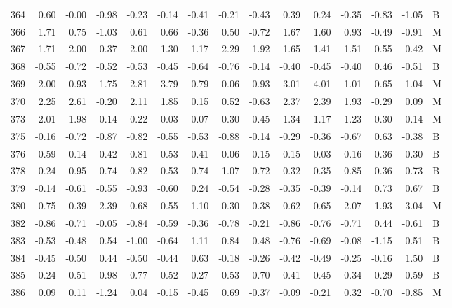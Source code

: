 \begin{table}[ht]
\begin{tabular}{rrrrrrrrrrrrrrl}
  364 & 0.60 & -0.00 & -0.98 & -0.23 & -0.14 & -0.41 & -0.21 & -0.43 & 0.39 & 0.24 & -0.35 & -0.83 & -1.05 & B \\ 
  366 & 1.71 & 0.75 & -1.03 & 0.61 & 0.66 & -0.36 & 0.50 & -0.72 & 1.67 & 1.60 & 0.93 & -0.49 & -0.91 & M \\ 
  367 & 1.71 & 2.00 & -0.37 & 2.00 & 1.30 & 1.17 & 2.29 & 1.92 & 1.65 & 1.41 & 1.51 & 0.55 & -0.42 & M \\ 
  368 & -0.55 & -0.72 & -0.52 & -0.53 & -0.45 & -0.64 & -0.76 & -0.14 & -0.40 & -0.45 & -0.40 & 0.46 & -0.51 & B \\ 
  369 & 2.00 & 0.93 & -1.75 & 2.81 & 3.79 & -0.79 & 0.06 & -0.93 & 3.01 & 4.01 & 1.01 & -0.65 & -1.04 & M \\ 
  370 & 2.25 & 2.61 & -0.20 & 2.11 & 1.85 & 0.15 & 0.52 & -0.63 & 2.37 & 2.39 & 1.93 & -0.29 & 0.09 & M \\ 
  373 & 2.01 & 1.98 & -0.14 & -0.22 & -0.03 & 0.07 & 0.30 & -0.45 & 1.34 & 1.17 & 1.23 & -0.30 & 0.14 & M \\ 
  375 & -0.16 & -0.72 & -0.87 & -0.82 & -0.55 & -0.53 & -0.88 & -0.14 & -0.29 & -0.36 & -0.67 & 0.63 & -0.38 & B \\ 
  376 & 0.59 & 0.14 & 0.42 & -0.81 & -0.53 & -0.41 & 0.06 & -0.15 & 0.15 & -0.03 & 0.16 & 0.36 & 0.30 & B \\ 
  378 & -0.24 & -0.95 & -0.74 & -0.82 & -0.53 & -0.74 & -1.07 & -0.72 & -0.32 & -0.35 & -0.85 & -0.36 & -0.73 & B \\ 
  379 & -0.14 & -0.61 & -0.55 & -0.93 & -0.60 & 0.24 & -0.54 & -0.28 & -0.35 & -0.39 & -0.14 & 0.73 & 0.67 & B \\ 
  380 & -0.75 & 0.39 & 2.39 & -0.68 & -0.55 & 1.10 & 0.30 & -0.38 & -0.62 & -0.65 & 2.07 & 1.93 & 3.04 & M \\ 
  382 & -0.86 & -0.71 & -0.05 & -0.84 & -0.59 & -0.36 & -0.78 & -0.21 & -0.86 & -0.76 & -0.71 & 0.44 & -0.61 & B \\ 
  383 & -0.53 & -0.48 & 0.54 & -1.00 & -0.64 & 1.11 & 0.84 & 0.48 & -0.76 & -0.69 & -0.08 & -1.15 & 0.51 & B \\ 
  384 & -0.45 & -0.50 & 0.44 & -0.50 & -0.44 & 0.63 & -0.18 & -0.26 & -0.42 & -0.49 & -0.25 & -0.16 & 1.50 & B \\ 
  385 & -0.24 & -0.51 & -0.98 & -0.77 & -0.52 & -0.27 & -0.53 & -0.70 & -0.41 & -0.45 & -0.34 & -0.29 & -0.59 & B \\ 
  386 & 0.09 & 0.11 & -1.24 & 0.04 & -0.15 & -0.45 & 0.69 & -0.37 & -0.09 & -0.21 & 0.32 & -0.70 & -0.85 & M \\ 

\end{tabular}
\end{table}
